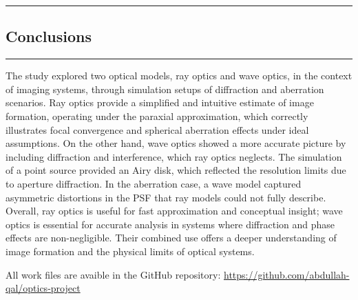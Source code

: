 {\color{gray}\hrule}
\begin{center}
\section{Conclusions}
\bigskip
\end{center}
{\color{gray}\hrule}
\begin{multicols}{2}
The study explored two optical models, ray optics and wave optics, in the context of imaging systems, through simulation setups
of diffraction and aberration scenarios. Ray optics provide a simplified and intuitive estimate of image formation, operating
under the paraxial approximation, which correctly illustrates focal convergence and spherical aberration effects under ideal
assumptions. On the other hand, wave optics showed a more accurate picture by including diffraction and interference, which ray
optics neglects. The simulation of a point source provided an Airy disk, which reflected the resolution limits due to aperture
diffraction. In the aberration case, a wave model captured asymmetric distortions in the PSF that ray models could not fully
describe. Overall, ray optics is useful for fast approximation and conceptual insight; wave optics is essential for accurate
analysis in systems where diffraction and phase effects are non-negligible. Their combined use offers a deeper understanding of
image formation and the physical limits of optical systems.

\end{multicols}

All work files are avaible in the GitHub repository: \url{https://github.com/abdullah-qal/optics-project}